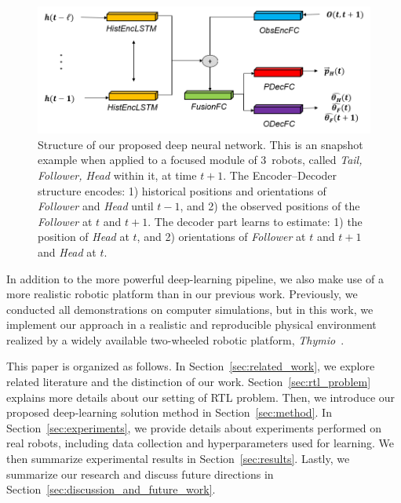\documentclass[letterpaper, 10 pt, conference]{ieeeconf}  %
\begin{document}
	\begin{figure}\centering
		\includegraphics[width=1.\columnwidth]{fig_DL_Pipeline}
		\caption{Structure of our proposed deep neural network.
			This is an snapshot example when applied to a focused module of
			$3$~robots, called \emph{Tail, Follower, Head} within it, at time $t+1$.
            The Encoder--Decoder structure encodes: 1) historical
            positions and orientations of \emph{Follower} and \emph{Head}
            until $t-1$, and 2) the observed positions of the \emph{Follower} at
            $t$ and $t+1$. The decoder part learns to estimate: 1) the
            position of \emph{Head} at $t$, and 2) orientations of
            \emph{Follower} at $t$ and $t+1$ and \emph{Head} at $t$.
		}
		\label{fig:DL_Pipeline}
	\end{figure}
    In addition to the more powerful deep-learning pipeline, we also
    make use of a more realistic robotic platform than in our previous
    work. Previously, we conducted all demonstrations on computer
    simulations, but in this work, we implement our approach in a
    realistic and reproducible physical environment realized by a widely
    available two-wheeled robotic platform, \emph{Thymio}~\cite{Shin14}.


    This paper is organized as follows. In
    Section~\ref{sec:related_work}, we explore related literature and
    the distinction of our work. Section~\ref{sec:rtl_problem} explains
    more details about our setting of RTL problem. Then, we introduce
    our proposed deep-learning solution method in
    Section~\ref{sec:method}. In Section~\ref{sec:experiments}, we
    provide details about experiments performed on real robots,
    including data collection and hyperparameters used for learning. We
    then summarize experimental results in Section~\ref{sec:results}.
    Lastly, we summarize our research and discuss future directions in
    Section~\ref{sec:discussion_and_future_work}.
\end{document}
